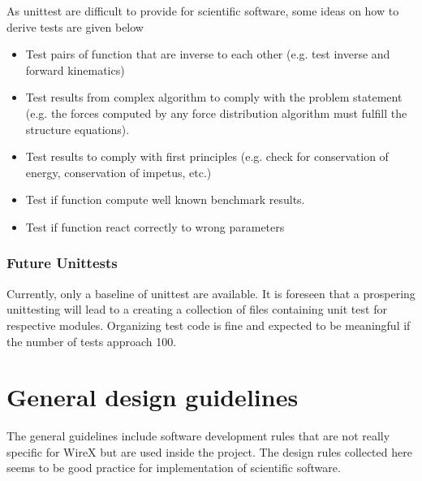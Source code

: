 \documentclass[11pt,a4paper,onepage,openany]{book}
\begin{document}
As unittest are difficult to provide for scientific software, some ideas on how to derive tests are given below
\begin{itemize}
\item Test pairs of function that are inverse to each other (e.g. test inverse and forward kinematics)

\item Test results from complex algorithm to comply with the problem statement (e.g. the forces computed by any force distribution algorithm must fulfill the structure equations).

\item Test results to comply with first principles (e.g. check for conservation of energy, conservation of impetus, etc.)

\item Test if function compute well known benchmark results.

\item Test if function react correctly to wrong parameters
\end{itemize}

\subsection{Future Unittests}
Currently, only a baseline of unittest are available. It is foreseen that a
prospering unittesting will lead to a creating a collection of files containing
unit test for respective modules. Organizing test code is fine and expected to
be meaningful if the number of tests approach 100.

\chapter{General design guidelines}\label{sec:DesignGuidelines}%
The general guidelines include software development rules that are not really
specific for WireX but are used inside the project. The design rules collected
here seems to be good practice for implementation of scientific software.
\end{document}
